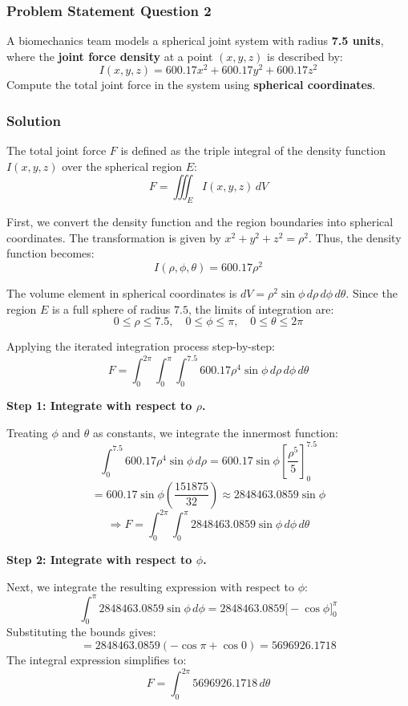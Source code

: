 \subsubsection*{Problem Statement Question 2}
A biomechanics team models a spherical joint system with radius \textbf{7.5 units}, where the \textbf{joint force density} at a point $(x, y, z)$ is described by:
\[ I(x,y,z) = 600.17x^{2} + 600.17y^{2} + 600.17z^{2} \]
Compute the total joint force in the system using \textbf{spherical coordinates}.

\subsubsection*{Solution}
The total joint force $F$ is defined as the triple integral of the density function $I(x, y, z)$ over the spherical region $E$:
\[ F = \iiint_E I(x, y, z) \, dV \]

First, we convert the density function and the region boundaries into spherical coordinates. The transformation is given by $x^2 + y^2 + z^2 = \rho^2$. Thus, the density function becomes:
\[ I(\rho, \phi, \theta) = 600.17\rho^2 \]

The volume element in spherical coordinates is $dV = \rho^2 \sin\phi \, d\rho \, d\phi \, d\theta$. Since the region $E$ is a full sphere of radius $7.5$, the limits of integration are:
\[ 0 \le \rho \le 7.5, \quad 0 \le \phi \le \pi, \quad 0 \le \theta \le 2\pi \]

Applying the iterated integration process step-by-step:
\[ F = \int_{0}^{2\pi} \int_{0}^{\pi} \int_{0}^{7.5} 600.17 \rho^4 \sin\phi \, d\rho \, d\phi \, d\theta \]

\vspace{1cm}
\noindent\textbf{Step 1: Integrate with respect to $\rho$.}

Treating $\phi$ and $\theta$ as constants, we integrate the innermost function:
\[ \int_{0}^{7.5} 600.17 \rho^4 \sin\phi \, d\rho = 600.17 \sin\phi \left[ \frac{\rho^5}{5} \right]_{0}^{7.5} \]
\[ = 600.17 \sin\phi \left( \frac{151875}{32} \right) \approx 2848463.0859 \sin\phi \]
\[ \Rightarrow F = \int_{0}^{2\pi} \int_{0}^{\pi} 2848463.0859 \sin\phi \, d\phi \, d\theta \]

\vspace{1cm}
\noindent\textbf{Step 2: Integrate with respect to $\phi$.}

Next, we integrate the resulting expression with respect to $\phi$:
\[ \int_{0}^{\pi} 2848463.0859 \sin\phi \, d\phi = 2848463.0859 \Big[-\cos\phi\Big]_{0}^{\pi} \]
Substituting the bounds gives:
\[ = 2848463.0859 (-\cos\pi + \cos0) = 5696926.1718 \]
The integral expression simplifies to:
\[ F = \int_{0}^{2\pi} 5696926.1718 \, d\theta \]

